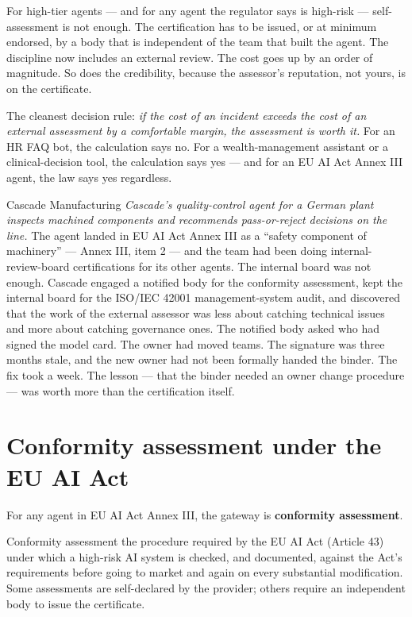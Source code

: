 For high-tier agents --- and for any agent the regulator says is high-risk --- self-assessment is not enough. The certification has to be issued, or at minimum endorsed, by a body that is independent of the team that built the agent. The discipline now includes an external review. The cost goes up by an order of magnitude. So does the credibility, because the assessor's reputation, not yours, is on the certificate.

The cleanest decision rule: \textit{if the cost of an incident exceeds the cost of an external assessment by a comfortable margin, the assessment is worth it.} For an HR FAQ bot, the calculation says no. For a wealth-management assistant or a clinical-decision tool, the calculation says yes --- and for an EU AI Act Annex III agent, the law says yes regardless.

\begin{TNinpractice}{Cascade Manufacturing} \textit{Cascade's quality-control agent for a German plant inspects machined components and recommends pass-or-reject decisions on the line.} The agent landed in EU AI Act Annex III as a ``safety component of machinery'' --- Annex III, item 2 --- and the team had been doing internal-review-board certifications for its other agents. The internal board was not enough. Cascade engaged a notified body for the conformity assessment, kept the internal board for the ISO/IEC 42001 management-system audit, and discovered that the work of the external assessor was less about catching technical issues and more about catching governance ones. The notified body asked who had signed the model card. The owner had moved teams. The signature was three months stale, and the new owner had not been formally handed the binder. The fix took a week. The lesson --- that the binder needed an owner change procedure --- was worth more than the certification itself. \end{TNinpractice}

\section{Conformity assessment under the EU AI Act}

For any agent in EU AI Act Annex III, the gateway is \textbf{conformity assessment}.

\begin{TNdefinition}{Conformity assessment} the procedure required by the EU AI Act (Article 43) under which a high-risk AI system is checked, and documented, against the Act's requirements before going to market and again on every substantial modification. Some assessments are self-declared by the provider; others require an independent body to issue the certificate. \end{TNdefinition}

